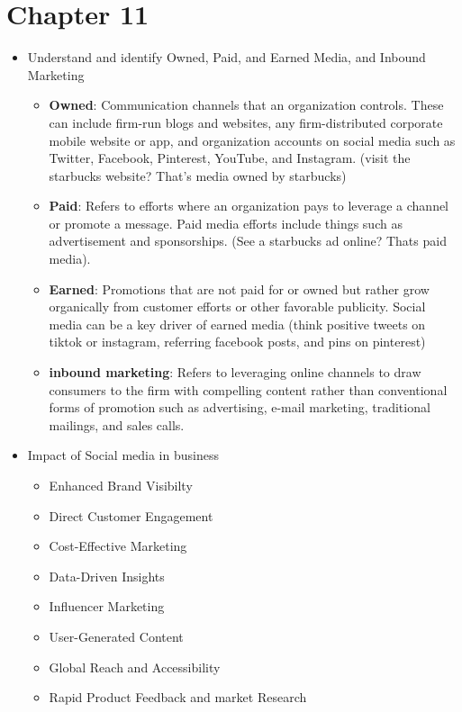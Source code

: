 \documentclass{report}
\begin{document}
\chapter*{Chapter 11}
\begin{itemize}
    \item Understand and identify Owned, Paid, and Earned Media, and Inbound Marketing
        \begin{itemize}[label=$\circ$]
            \item \textbf{Owned}: Communication channels that an organization controls. These can include firm-run blogs and websites, any firm-distributed corporate mobile website or app, and organization accounts on social media such as Twitter, Facebook, Pinterest, YouTube, and Instagram. (visit the starbucks website? That's media owned by starbucks)
            \item \textbf{Paid}: Refers to efforts where an organization pays to leverage a channel or promote a message. Paid media efforts include things such as advertisement and sponsorships. (See a starbucks ad online? Thats paid media).
            \item \textbf{Earned}: Promotions that are not paid for or owned but rather grow organically from customer efforts or other favorable publicity. Social media can be a key driver of earned media (think positive tweets on tiktok or instagram, referring facebook posts, and pins on pinterest)
            \item \textbf{inbound marketing}: Refers to leveraging online channels to draw consumers to the firm with compelling content rather than conventional forms of promotion such as advertising, e-mail marketing, traditional mailings, and sales calls.
        \end{itemize}
    \item Impact of Social media in business
        \begin{itemize}
            \item Enhanced Brand Visibilty
            \item Direct Customer Engagement
            \item Cost-Effective Marketing
            \item Data-Driven Insights
            \item Influencer Marketing
            \item User-Generated Content
            \item Global Reach and Accessibility
            \item Rapid Product Feedback and market Research

\end{itemize}
\end{itemize}
\end{document}
